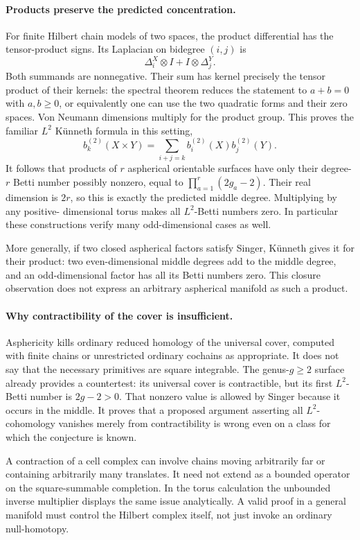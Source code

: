 \documentclass[11pt]{article}
\begin{document}
\paragraph{Products preserve the predicted concentration.}
For finite Hilbert chain models of two spaces, the product differential
has the tensor-product signs. Its Laplacian on bidegree $(i,j)$ is
\[
                    \Delta_i^X\otimes I+I\otimes\Delta_j^Y.
\]
Both summands are nonnegative. Their sum has kernel precisely the
tensor product of their kernels: the spectral theorem reduces the
statement to $a+b=0$ with $a,b\ge0$, or equivalently one can use the
two quadratic forms and their zero spaces. Von Neumann dimensions
multiply for the product group. This proves the familiar $L^2$
K\"unneth formula in this setting,
\[
 b_k^{(2)}(X\times Y)=\sum_{i+j=k}b_i^{(2)}(X)b_j^{(2)}(Y).
\]
It follows that products of $r$ aspherical orientable surfaces have
only their degree-$r$ Betti number possibly nonzero, equal to
$\prod_{a=1}^r(2g_a-2)$. Their real dimension is $2r$, so this is
exactly the predicted middle degree. Multiplying by any positive-
dimensional torus makes all $L^2$-Betti numbers zero. In particular
these constructions verify many odd-dimensional cases as well.

More generally, if two closed aspherical factors satisfy Singer,
K\"unneth gives it for their product: two even-dimensional middle
degrees add to the middle degree, and an odd-dimensional factor has
all its Betti numbers zero. This closure observation does not express
an arbitrary aspherical manifold as such a product.

\paragraph{Why contractibility of the cover is insufficient.}
Asphericity kills ordinary reduced homology of the universal cover,
computed with finite chains or unrestricted ordinary cochains as
appropriate. It does not say that the necessary primitives are square
integrable. The genus-$g\ge2$ surface already provides a countertest:
its universal cover is contractible, but its first $L^2$-Betti number
is $2g-2>0$. That nonzero value is allowed by Singer because it occurs
in the middle. It proves that a proposed argument asserting all
$L^2$-cohomology vanishes merely from contractibility is wrong even
on a class for which the conjecture is known.

A contraction of a cell complex can involve chains moving arbitrarily
far or containing arbitrarily many translates. It need not extend as
a bounded operator on the square-summable completion. In the torus
calculation the unbounded inverse multiplier displays the same issue
analytically. A valid proof in a general manifold must control the
Hilbert complex itself, not just invoke an ordinary null-homotopy.
\end{document}
